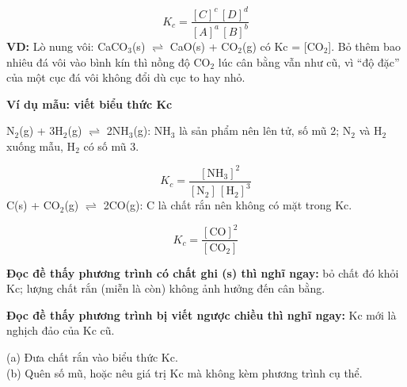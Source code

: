 \[ K_c = \dfrac{[C]^c\,[D]^d}{[A]^a\,[B]^b} \]
\textbf{VD:} Lò nung vôi: CaCO$_{3}$(s) $\rightleftharpoons$ CaO(s) + CO$_{2}$(g) có Kc = [CO$_{2}$]. Bỏ thêm bao nhiêu đá vôi vào bình kín thì nồng độ CO$_{2}$ lúc cân bằng vẫn như cũ, vì ``độ đặc'' của một cục đá vôi không đổi dù cục to hay nhỏ.

\Needspace{11cm}
\begin{keybox}{\color{primaryBlue}\textbf{Ví dụ mẫu: viết biểu thức Kc}}\par
N$_{2}$(g) + 3H$_{2}$(g) $\rightleftharpoons$ 2NH$_{3}$(g): NH$_{3}$ là sản phẩm nên lên tử, số mũ 2; N$_{2}$ và H$_{2}$ xuống mẫu, H$_{2}$ có số mũ 3.

\[ K_c = \dfrac{[\mathrm{NH_3}]^2}{[\mathrm{N_2}]\,[\mathrm{H_2}]^3} \]
C(s) + CO$_{2}$(g) $\rightleftharpoons$ 2CO(g): C là chất rắn nên không có mặt trong Kc.

\[ K_c = \dfrac{[\mathrm{CO}]^2}{[\mathrm{CO_2}]} \]
\end{keybox}
\begin{reflexbox}
\item \textbf{Đọc đề thấy phương trình có chất ghi (s) thì nghĩ ngay:} bỏ chất đó khỏi Kc; lượng chất rắn (miễn là còn) không ảnh hưởng đến cân bằng.
\item \textbf{Đọc đề thấy phương trình bị viết ngược chiều thì nghĩ ngay:} Kc mới là nghịch đảo của Kc cũ.
\end{reflexbox}
\begin{trapbox}(a) Đưa chất rắn vào biểu thức Kc.\\ (b) Quên số mũ, hoặc nêu giá trị Kc mà không kèm phương trình cụ thể.\end{trapbox}

